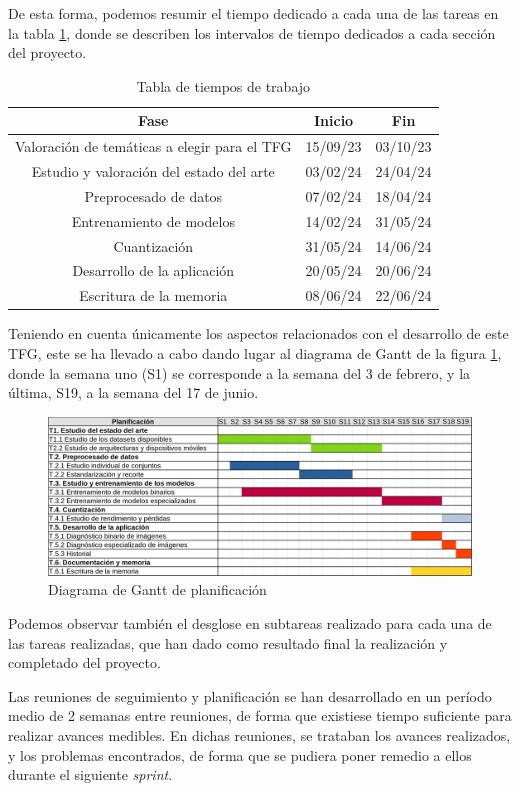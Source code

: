 De esta forma, podemos resumir el tiempo dedicado a cada una de las tareas en la tabla \ref{tab:planif}, donde se describen los intervalos de tiempo dedicados a cada sección del proyecto.

\begin{table}[H]
	\centering
	\begin{tabular}{|c|c|c|}
		\hline
		\textbf{Fase} & \textbf{Inicio} & \textbf{Fin} \\ \hline
		Valoración de temáticas a elegir para el TFG & 15/09/23 & 03/10/23 \\ \hline
		Estudio y valoración del estado del arte & 03/02/24 & 24/04/24 \\ \hline
		Preprocesado de datos & 07/02/24 & 18/04/24 \\ \hline
		Entrenamiento de modelos & 14/02/24 & 31/05/24 \\ \hline
		Cuantización & 31/05/24 & 14/06/24 \\ \hline
		Desarrollo de la aplicación & 20/05/24 & 20/06/24 \\ \hline
		Escritura de la memoria & 08/06/24 & 22/06/24 \\ \hline
	\end{tabular}
	\caption{Tabla de tiempos de trabajo}
	\label{tab:planif}
\end{table}

Teniendo en cuenta únicamente los aspectos relacionados con el desarrollo de este TFG, este se ha llevado a cabo dando lugar al diagrama de Gantt de la figura \ref{fig:gantt}, donde la semana uno (S1) se corresponde a la semana del 3 de febrero, y la última, S19, a la semana del 17 de junio.

\begin{figure}[H]
	\centering
	\includegraphics[scale = 0.1755]{imagenes/ganttplan.png}
	\caption{Diagrama de Gantt de planificación}
	\label{fig:gantt}
\end{figure}


Podemos observar también el desglose en subtareas realizado para cada una de las tareas realizadas, que han dado como resultado final la realización y completado del proyecto.

Las reuniones de seguimiento y planificación se han desarrollado en un período medio de 2 semanas entre reuniones, de forma que existiese tiempo suficiente para realizar avances medibles. En dichas reuniones, se trataban los avances realizados, y los problemas encontrados, de forma que se pudiera poner remedio a ellos durante el siguiente \textit{sprint}.